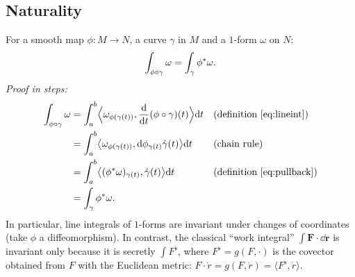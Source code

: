\subsection{Naturality}\label{sec:naturality}

For a smooth map $\phi:M\to N$, a curve $\gamma$ in $M$ and a $1$-form $\omega$ on $N$:
\begin{equation}\label{eq:natural}
\int_{\phi\circ\gamma}\omega=\int_\gamma\phi{}^{*}\omega .
\end{equation}
\emph{Proof in steps:}
\begin{align*}
\int_{\phi\circ\gamma}\omega&=\int_a^b\Bigl\langle\omega_{\phi(\gamma(t))},\frac{\mathrm{d}}{\mathrm{d} t}(\phi\circ\gamma)(t)\Bigr\rangle\mathrm{d} t &&\text{(definition \eqref{eq:lineint})}\\
&=\int_a^b\bigl\langle\omega_{\phi(\gamma(t))},\mathrm{d}\phi_{\gamma(t)}\dot\gamma(t)\bigr\rangle\mathrm{d} t &&\text{(chain rule)}\\
&=\int_a^b\bigl\langle(\phi{}^{*}\omega)_{\gamma(t)},\dot\gamma(t)\bigr\rangle\mathrm{d} t &&\text{(definition \eqref{eq:pullback})}\\
&=\int_\gamma\phi{}^{*}\omega .
\end{align*}
In particular, line integrals of $1$-forms are invariant under changes of coordinates (take $\phi$ a diffeomorphism). In contrast, the classical ``work integral'' $\int\mathbf F\cdot\dd\mathbf r$ is invariant only because it is secretly $\int F^\flat$, where $F^\flat=g(F,\cdot)$ is the covector obtained from $F$ with the Euclidean metric: $F\cdot\dot r=g(F,\dot r)=\langle F^\flat,\dot r\rangle$.
